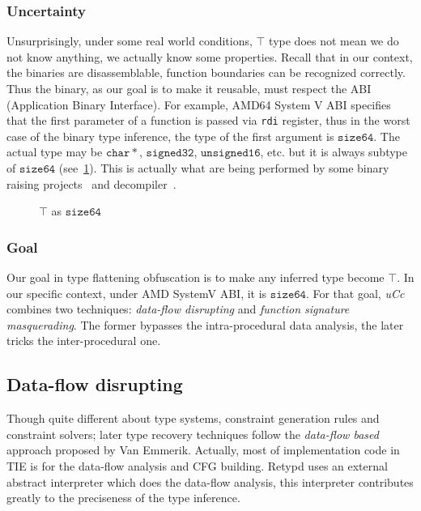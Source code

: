 \documentclass[compsoc,conference,a4paper,10pt,times]{IEEEtran}
\begin{document}
\subsubsection*{Uncertainty}
Unsurprisingly, under some real world conditions, $\top$ type does not mean we do not know anything,
we actually know some properties. Recall that in our context, the binaries are disassemblable, function boundaries can be
recognized correctly.
Thus the binary, as our goal is to make it reusable, must respect the ABI (Application
Binary Interface). For example, AMD64 System V ABI specifies that the first parameter of
a function is passed via \texttt{rdi} register, thus in the worst case of the binary type
inference, the type of the first argument is $\mathtt{size64}$. The actual type may be
$\mathtt{char*}$, $\mathtt{signed32}$, $\mathtt{unsigned16}$, etc. but it is always
subtype of $\mathtt{size64}$ (see~\cref{fig:newtop}). This is actually what are being performed by some binary raising
projects~\cite{goodman_lifting_2018,yadavalli_raising_2019} and decompiler~\cite{durfina_detection_2012}.
\begin{figure}[h]
  \centering
  \caption{$\top$ as $\mathtt{size64}$}
  \label{fig:newtop}
\end{figure}

\subsubsection*{Goal}
Our goal in type flattening obfuscation is to make any inferred type become $\top$. In our specific
context, under AMD SystemV ABI, it is $\mathtt{size64}$. For that goal, \emph{uCc} combines two
techniques: \emph{data-flow disrupting} and \emph{function signature masquerading}. The former
bypasses the intra-procedural data analysis, the later tricks the inter-procedural one.

\subsection{Data-flow disrupting}
\noindent
Though quite different about type systems, constraint generation rules and constraint solvers;
later type recovery techniques follow the \emph{data-flow based} approach proposed by Van Emmerik.
Actually, most of implementation code in TIE is for the data-flow analysis
and CFG building. Retypd uses an external abstract interpreter
which does the data-flow analysis, this interpreter contributes greatly to the
preciseness of the type inference.
\end{document}
